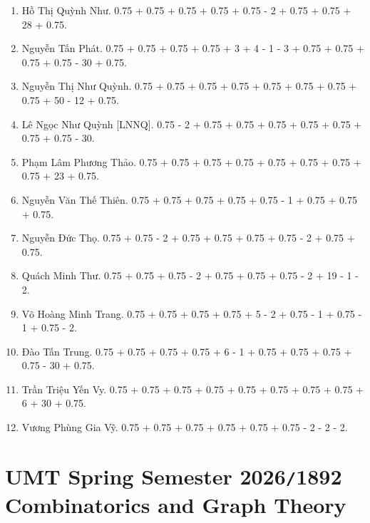 \documentclass{article}
\begin{document}
\begin{enumerate}
	\item {\sc Hồ Thị Quỳnh Như.} 0.75 + 0.75 + 0.75 + 0.75 + 0.75 - 2 + 0.75 + 0.75 + 28 + 0.75.
	\item {\sc Nguyễn Tấn Phát.} 0.75 + 0.75 + 0.75 + 0.75 + 3 + 4 - 1 - 3 + 0.75 + 0.75 + 0.75 + 0.75 - 30 + 0.75.
	\item {\sc Nguyễn Thị Như Quỳnh.} 0.75 + 0.75 + 0.75 + 0.75 + 0.75 + 0.75 + 0.75 + 0.75 + 50 - 12 + 0.75.
	\item {\sc Lê Ngọc Như Quỳnh [LNNQ].} 0.75 - 2 + 0.75 + 0.75 + 0.75 + 0.75 + 0.75 + 0.75 + 0.75 - 30.
	\item {\sc Phạm Lâm Phương Thảo.} 0.75 + 0.75 + 0.75 + 0.75 + 0.75 + 0.75 + 0.75 + 0.75 + 23 + 0.75.
	\item {\sc Nguyễn Văn Thế Thiên.} 0.75 + 0.75 + 0.75 + 0.75 + 0.75 - 1 + 0.75 + 0.75 + 0.75.
	\item {\sc Nguyễn Đức Thọ.} 0.75 + 0.75 - 2 + 0.75 + 0.75 + 0.75 + 0.75 - 2 + 0.75 + 0.75.
	\item {\sc Quách Minh Thư.} 0.75 + 0.75 + 0.75 - 2 + 0.75 + 0.75 + 0.75 - 2 + 19 - 1 - 2.
	\item {\sc Võ Hoàng Minh Trang.} 0.75 + 0.75 + 0.75 + 0.75 + 5 - 2 + 0.75 - 1 + 0.75 - 1 + 0.75 - 2.
	\item {\sc Đào Tấn Trung.} 0.75 + 0.75 + 0.75 + 0.75 + 6 - 1 + 0.75 + 0.75 + 0.75 + 0.75 - 30 + 0.75.
	\item {\sc Trần Triệu Yến Vy.} 0.75 + 0.75 + 0.75 + 0.75 + 0.75 + 0.75 + 0.75 + 0.75 + 6 + 30 + 0.75.
	\item {\sc Vương Phùng Gia Vỹ.} 0.75 + 0.75 + 0.75 + 0.75 + 0.75 + 0.75 - 2 - 2 - 2.
\end{enumerate}


\section{UMT Spring Semester 2026{\tt/}1892 Combinatorics and Graph Theory}
\end{document}
